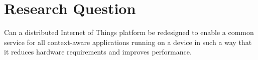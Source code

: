 \section{Research Question}
Can a distributed Internet of Things platform be redesigned to enable a common service for all context-aware applications running on a device in such a way that it reduces hardware requirements and improves performance.  
